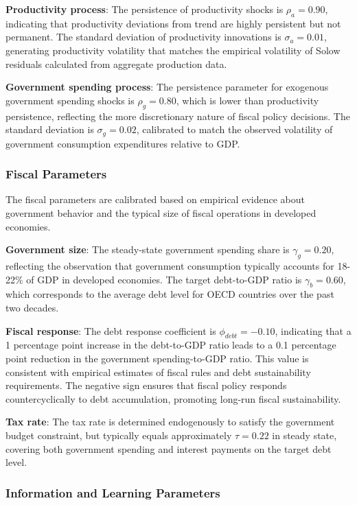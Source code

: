 \documentclass[5p,authoryear]{elsarticle}
\begin{document}
\textbf{Productivity process}: The persistence of productivity shocks is $\rho_a = 0.90$, indicating that productivity deviations from trend are highly persistent but not permanent. The standard deviation of productivity innovations is $\sigma_a = 0.01$, generating productivity volatility that matches the empirical volatility of Solow residuals calculated from aggregate production data.

\textbf{Government spending process}: The persistence parameter for exogenous government spending shocks is $\rho_g = 0.80$, which is lower than productivity persistence, reflecting the more discretionary nature of fiscal policy decisions. The standard deviation is $\sigma_g = 0.02$, calibrated to match the observed volatility of government consumption expenditures relative to GDP.

\subsubsection{Fiscal Parameters}

The fiscal parameters are calibrated based on empirical evidence about government behavior and the typical size of fiscal operations in developed economies.

\textbf{Government size}: The steady-state government spending share is $\gamma_g = 0.20$, reflecting the observation that government consumption typically accounts for 18-22\% of GDP in developed economies. The target debt-to-GDP ratio is $\gamma_b = 0.60$, which corresponds to the average debt level for OECD countries over the past two decades.

\textbf{Fiscal response}: The debt response coefficient is $\phi_{debt} = -0.10$, indicating that a 1 percentage point increase in the debt-to-GDP ratio leads to a 0.1 percentage point reduction in the government spending-to-GDP ratio. This value is consistent with empirical estimates of fiscal rules and debt sustainability requirements. The negative sign ensures that fiscal policy responds countercyclically to debt accumulation, promoting long-run fiscal sustainability.

\textbf{Tax rate}: The tax rate is determined endogenously to satisfy the government budget constraint, but typically equals approximately $\tau = 0.22$ in steady state, covering both government spending and interest payments on the target debt level.

\subsubsection{Information and Learning Parameters}
\end{document}
